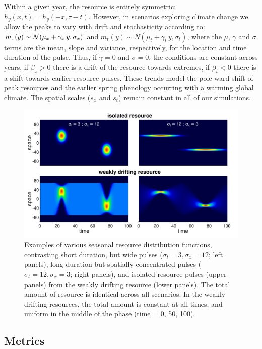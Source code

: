 \documentclass[12pt]{article}
\begin{document}
Within a given year, the resource is entirely symmetric: $h_y(x,t) = h_y(-x, \tau-t)$. However, in scenarios exploring climate change we allow the peaks to vary with drift and stochasticity according to: $m_x(y) \sim {\cal N}(\mu_x + \gamma_x\,y, \sigma_x)$ and $m_t(y) \sim {N}(\mu_t + \gamma_t\,y, \sigma_t)$, where the $\mu$, $\gamma$ and $\sigma$ terms are the mean, slope and variance, respectively, for the location and time duration of the pulse. Thus, if $\gamma=0$ and $\sigma=0$, the conditions are constant across years, if $\beta_x > 0$ there is a drift of the resource towards extremes, if $\beta_t < 0$ there is a shift towards earlier resource pulses. These trends model the pole-ward shift of peak resources and the earlier spring phenology occurring with a warming global climate. The spatial scales ($s_x$ and $s_t$) remain constant in all of our simulations. 

\begin{figure}[t!]
\includegraphics[width = \textwidth]{figures/ResourceExamples.png}

\caption{\label{fig_ResourceExamples}  Examples of various seasonal resource distribution functions, contrasting short duration, but wide pulses ($\sigma_t = 3, \sigma_x = 12$; left panels), long duration but spatially concentrated pulses ($\sigma_t = 12, \sigma_x = 3$; right panels), and isolated resource pulses (upper panels) from the weakly drifting resource (lower panels). The total amount of resource is identical across all scenarios. In the weakly drifting resources, the total amount is constant at all times, and uniform in the middle of the phase (time = 0, 50, 100).}
\end{figure}

\subsection{Metrics}
\end{document}
